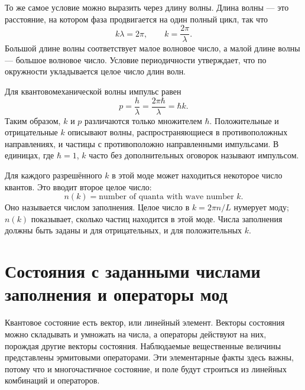 То же самое условие можно выразить через длину волны. Длина волны — это расстояние, на котором фаза продвигается на один полный цикл, так что
\begin{equation}
k\lambda=2\pi,
\qquad
k=\frac{2\pi}{\lambda}.
\end{equation}
Большой длине волны соответствует малое волновое число, а малой длине волны — большое волновое число. Условие периодичности утверждает, что по окружности укладывается целое число длин волн.

Для квантовомеханической волны импульс равен
\begin{equation}
p=\frac{h}{\lambda}
=\frac{2\pi\hbar}{\lambda}
=\hbar k.
\end{equation}
Таким образом, \(k\) и \(p\) различаются только множителем \(\hbar\). Положительные и отрицательные \(k\) описывают волны, распространяющиеся в противоположных направлениях, и частицы с противоположно направленными импульсами. В единицах, где \(\hbar=1\), \(k\) часто без дополнительных оговорок называют импульсом.

Для каждого разрешённого \(k\) в этой моде может находиться некоторое число квантов. Это вводит второе целое число:
\begin{equation}
n(k)=\text{number of quanta with wave number }k.
\end{equation}
Оно называется числом заполнения. Целое число в \(k=2\pi n/L\) нумерует моду; \(n(k)\) показывает, сколько частиц находится в этой моде. Числа заполнения должны быть заданы и для отрицательных, и для положительных \(k\).

\begin{classroomqa}
\end{classroomqa}

\section{Состояния с заданными числами заполнения и операторы мод}

Квантовое состояние есть вектор, или линейный элемент. Векторы состояния можно складывать и умножать на числа, а операторы действуют на них, порождая другие векторы состояния. Наблюдаемые вещественные величины представлены эрмитовыми операторами. Эти элементарные факты здесь важны, потому что и многочастичное состояние, и поле будут строиться из линейных комбинаций и операторов.

